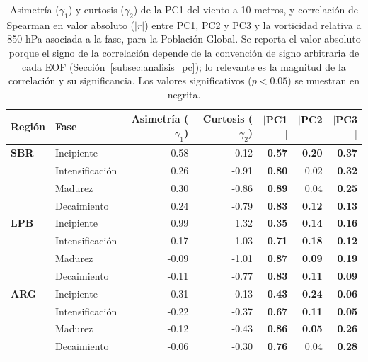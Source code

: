 \begin{table}[htbp]
\centering
\caption[Momentos estadísticos y correlación de PC1--PC3 del viento a 10 m - Población Global]
{Asimetría ($\gamma_1$) y curtosis ($\gamma_2$) de la PC1 del viento a 10 metros, y correlación de Spearman en valor absoluto ($|r|$) entre PC1, PC2 y PC3 y la vorticidad relativa a 850 hPa asociada a la fase, para la Población Global. Se reporta el valor absoluto porque el signo de la correlación depende de la convención de signo arbitraria de cada EOF (Sección~\ref{subsec:analisis_pc}); lo relevante es la magnitud de la correlación y su significancia. Los valores significativos ($p<0.05$) se muestran en negrita.}
\label{tab:stat_global_w10}
\begin{tabular*}{\textwidth}{@{\extracolsep{\fill}}llrrrrr}
\hline
\textbf{Región} & \textbf{Fase} & \textbf{Asimetría ($\gamma_1$)} & \textbf{Curtosis ($\gamma_2$)} & \textbf{$|$PC1$|$} & \textbf{$|$PC2$|$} & \textbf{$|$PC3$|$} \\
\hline
\textbf{SBR} & Incipiente       & 0.58  & -0.12 & \textbf{0.57} & \textbf{0.20} & \textbf{0.37} \\
             & Intensificación & 0.26  & -0.91 & \textbf{0.80} & 0.02 & \textbf{0.32} \\
             & Madurez         & 0.30  & -0.86 & \textbf{0.89} & 0.04 & \textbf{0.25} \\
             & Decaimiento     & 0.24  & -0.79 & \textbf{0.83} & \textbf{0.12} & \textbf{0.13} \\
\hline
\textbf{LPB} & Incipiente       & 0.99  & 1.32  & \textbf{0.35} & \textbf{0.14} & \textbf{0.16} \\
             & Intensificación & 0.17  & -1.03 & \textbf{0.71} & \textbf{0.18} & \textbf{0.12} \\
             & Madurez         & -0.09 & -1.01 & \textbf{0.87} & \textbf{0.09} & \textbf{0.19} \\
             & Decaimiento     & -0.11 & -0.77 & \textbf{0.83} & \textbf{0.11} & \textbf{0.09} \\
\hline
\textbf{ARG} & Incipiente       & 0.31  & -0.13 & \textbf{0.43} & \textbf{0.24} & \textbf{0.06} \\
             & Intensificación & -0.22 & -0.37 & \textbf{0.67} & \textbf{0.11} & \textbf{0.05} \\
             & Madurez         & -0.12 & -0.43 & \textbf{0.86} & \textbf{0.05} & \textbf{0.26} \\
             & Decaimiento     & -0.06 & -0.30 & \textbf{0.76} & 0.04 & \textbf{0.28} \\
\hline
\end{tabular*}
\end{table}

